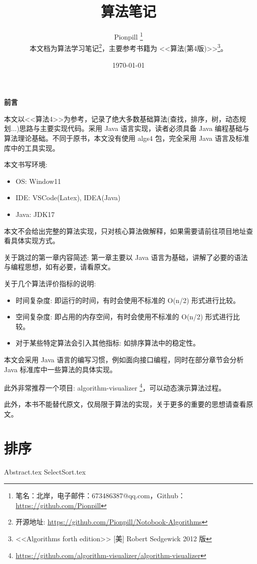 \documentclass{PionpillNote-book}
\title{算法笔记}
\author{
    Pionpill \footnote{笔名：北岸，电子邮件：673486387@qq.com，Github：\url{https://github.com/Pionpill}} \\
    本文档为算法学习笔记\footnote{开源地址: \url{https://github.com/Pionpill/Notobook-Algorithms}}，主要参考书籍为 <<算法(第4版)>>\footnote{<<Algorithms forth edition>> [美] Robert Sedgewick 2012 版}。
}
\date{\today}
\begin{document}
\pagestyle{plain}
\maketitle

\noindent\textbf{前言}

本文以<<算法4>>为参考，记录了绝大多数基础算法(查找，排序，树，动态规划...)思路与主要实现代码。采用 Java 语言实现，读者必须具备 Java 编程基础与算法理论基础。不同于原书，本文没有使用 algs4 包，完全采用 Java 语言及标准库中的工具实现。

本文书写环境:
\begin{itemize}
    \item OS: Window11
    \item IDE: VSCode(Latex), IDEA(Java)
    \item Java: JDK17
\end{itemize}

本文不会给出完整的算法实现，只对核心算法做解释，如果需要请前往项目地址查看具体实现方式。

关于跳过的第一章内容简述: 第一章主要以 Java 语言为基础，讲解了必要的语法与编程思想，如有必要，请看原文。

关于几个算法评价指标的说明:

\begin{itemize}
    \item 时间复杂度: 即运行的时间，有时会使用不标准的 O(n/2) 形式进行比较。
    \item 空间复杂度: 即占用的内存空间，有时会使用不标准的 O(n/2) 形式进行比较。
    \item 对于某些特定算法会引入其他指标: 如排序算法中的稳定性。
\end{itemize}

本文会采用 Java 语言的编写习惯，例如面向接口编程，同时在部分章节会分析 Java 标准库中一些算法的具体实现。

此外非常推荐一个项目: algorithm-visualizer
\footnote{\url{https://github.com/algorithm-visualizer/algorithm-visualizer}}，可以动态演示算法过程。

此外，本书不能替代原文，仅局限于算法的实现，关于更多的重要的思想请查看原文。

\newpage

\tableofcontents

\newpage

\setcounter{page}{1} 
\pagestyle{fancy}

\chapter{排序}
{Abstract.tex}
{SelectSort.tex}
\end{document}
